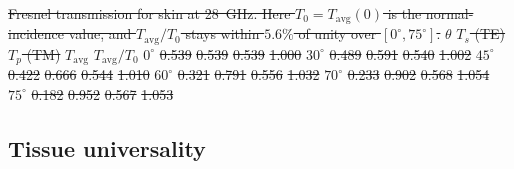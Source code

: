 \documentclass[journal,twocolumn,10pt]{IEEEtran}
\newcommand{\Tavg}{T_{\mathrm{avg}}}
\providecommand{\DIFdeltex}[1]{{\protect\color{red}\sout{#1}}}                      %
\providecommand{\DIFdelbegin}{} %
\providecommand{\DIFdelend}{} %
\providecommand{\DIFdelFL}[1]{\DIFdel{#1}} %
\providecommand{\DIFdel}[1]{\texorpdfstring{\DIFdeltex{#1}}{}} %
\newcommand{\DIFscaledelfig}{0.5}
\newlength{\DIFdelgraphicswidth} %
\newlength{\DIFdelgraphicsheight} %
\newcommand{\DIFdelincludegraphics}[2][]{%
\sbox{\DIFdelgraphicsbox}{\DIFOincludegraphics[#1]{#2}}%
\settoboxwidth{\DIFdelgraphicswidth}{\DIFdelgraphicsbox} %
\settoboxtotalheight{\DIFdelgraphicsheight}{\DIFdelgraphicsbox} %
\scalebox{\DIFscaledelfig}{%
\parbox[b]{\DIFdelgraphicswidth}{\usebox{\DIFdelgraphicsbox}\\[-\baselineskip] \rule{\DIFdelgraphicswidth}{0em}}\llap{\resizebox{\DIFdelgraphicswidth}{\DIFdelgraphicsheight}{%
\setlength{\unitlength}{\DIFdelgraphicswidth}%
\begin{picture}(1,1)%
\thicklines\linethickness{2pt} %
{\color[rgb]{1,0,0}\put(0,0){\framebox(1,1){}}}%
{\color[rgb]{1,0,0}\put(0,0){\line( 1,1){1}}}%
{\color[rgb]{1,0,0}\put(0,1){\line(1,-1){1}}}%
\end{picture}%
}\hspace*{3pt}}} %
} %
\DeclareRobustCommand{\DIFdelbegin}{\DIFOdelbegin \let\includegraphics\DIFdelincludegraphics} %
\DeclareRobustCommand{\DIFdelend}{\DIFOaddend \let\includegraphics\DIFOincludegraphics} %
\begin{document}
\DIFdelbegin %
{%
\DIFdelFL{Fresnel transmission for skin at 28~GHz. Here $T_0 =
\Tavg(0)$ is the normal-incidence value, and $\Tavg/T_0$ stays
within $5.6\%$ of unity over $[0^\circ, 75^\circ]$.}}
\DIFdelFL{$\theta$ }%
\DIFdelFL{$T_s$ (TE) }%
\DIFdelFL{$T_p$ (TM) }%
\DIFdelFL{$\Tavg$ }%
\DIFdelFL{$\Tavg/T_0$ }%
\DIFdelFL{$0^\circ$  }%
\DIFdelFL{0.539 }%
\DIFdelFL{0.539 }%
\DIFdelFL{0.539 }%
\DIFdelFL{1.000 }%
\DIFdelFL{$30^\circ$ }%
\DIFdelFL{0.489 }%
\DIFdelFL{0.591 }%
\DIFdelFL{0.540 }%
\DIFdelFL{1.002 }%
\DIFdelFL{$45^\circ$ }%
\DIFdelFL{0.422 }%
\DIFdelFL{0.666 }%
\DIFdelFL{0.544 }%
\DIFdelFL{1.010 }%
\DIFdelFL{$60^\circ$ }%
\DIFdelFL{0.321 }%
\DIFdelFL{0.791 }%
\DIFdelFL{0.556 }%
\DIFdelFL{1.032 }%
\DIFdelFL{$70^\circ$ }%
\DIFdelFL{0.233 }%
\DIFdelFL{0.902 }%
\DIFdelFL{0.568 }%
\DIFdelFL{1.054 }%
\DIFdelFL{$75^\circ$ }%
\DIFdelFL{0.182 }%
\DIFdelFL{0.952 }%
\DIFdelFL{0.567 }%
\DIFdelFL{1.053 }%

\DIFdelend \subsection{Tissue universality}\label{subsec:pB-tissues}
\end{document}
